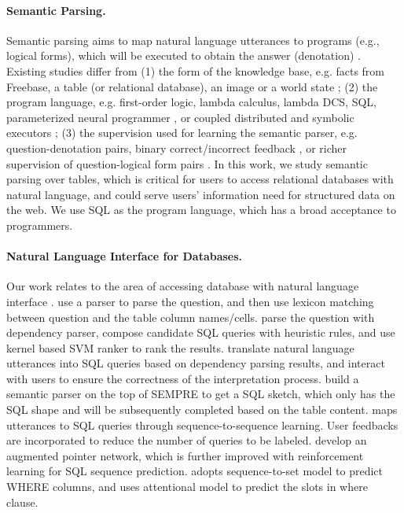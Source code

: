 \documentclass[11pt,a4paper]{article}
\begin{document}
\paragraph{Semantic Parsing.}
Semantic parsing
aims to map natural language utterances to programs (e.g., logical forms), which will be executed to obtain the answer (denotation) \cite{Zettlemoyer05,liang2011learning,berant2013semantic,poon2013grounded,krishnamurthy2013jointly,pasupat-liang:2016:P16-1,sun2016table,jia-liang:2016:P16-1,kovcisky-EtAl:2016:EMNLP2016,LinWPVZE2017:TR}.
Existing studies differ from
(1) the form of the knowledge base, e.g. facts from Freebase, a table (or relational database), an image \cite{suhr-EtAl:2017:Short,johnson2017inferring,hu2017learning,DBLP:journals/corr/abs-1711-05240} or a world state \cite{long-pasupat-liang:2016:P16-1};
(2) the program language, e.g. first-order logic, lambda calculus, lambda DCS, SQL, parameterized neural programmer \cite{yin2015neural,neelakantan2016learning}, or coupled distributed and symbolic executors \cite{mou17};
(3) the supervision used for learning the semantic parser, e.g. question-denotation pairs, binary correct/incorrect feedback \cite{artzi2013weakly}, or richer supervision of question-logical form pairs \cite{dong-lapata:2016:P16-1}.
In this work, we study semantic parsing over tables,
which is critical for users to access relational databases with natural language, and could serve users' information need for structured data on the web.
We use SQL as the program language, which has a broad acceptance to programmers.



\paragraph{Natural Language Interface for Databases.}
Our work relates to the area of accessing database with natural language interface \cite{dahl1994expanding,brad2017dataset}.
 use a parser to parse the question, and then use lexicon matching between question and the table column names/cells.
 parse the question with dependency parser, compose candidate SQL queries with heuristic rules, and use kernel based SVM ranker to rank the results.
 translate natural language utterances into SQL queries based on dependency parsing results, and interact with users to ensure the correctness of the interpretation process.
 build a semantic parser on the top of SEMPRE \cite{pasupat-liang:2015:ACL-IJCNLP} to get a SQL sketch, which only has the SQL shape and will be subsequently completed based on the table content.
 maps utterances to SQL queries through sequence-to-sequence learning.
User feedbacks are incorporated to reduce the number of queries to be labeled.
 develop an augmented pointer network, which is further improved with reinforcement learning for SQL sequence prediction.
 adopts sequence-to-set model to predict WHERE columns, and uses attentional model to predict the slots in where clause.
\end{document}
